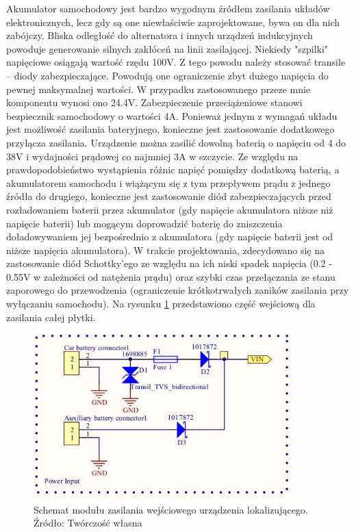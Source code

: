 Akumulator samochodowy jest bardzo wygodnym źródłem zasilania układów elektronicznych, lecz gdy są one niewłaściwie zaprojektowane, bywa on dla nich zabójczy. Bliska odległość do alternatora i innych urządzeń indukcyjnych powoduje generowanie silnych zakłóceń na linii zasilającej. Niekiedy "szpilki" napięciowe osiągają wartość rzędu 100V. Z tego powodu należy stosować transile – diody zabezpieczające. Powodują one ograniczenie zbyt dużego napięcia do pewnej maksymalnej wartości. W przypadku zastosowanego przeze mnie komponentu wynosi ono 24.4V. Zabezpieczenie przeciążeniowe stanowi bezpiecznik samochodowy o wartości 4A. 
Ponieważ jednym z wymagań układu jest możliwość zasilania bateryjnego, konieczne jest zastosowanie dodatkowego przyłącza zasilania. Urządzenie można zasilić dowolną baterią o napięciu od 4 do 38V i wydajności prądowej co najmniej 3A w szczycie. Ze względu na prawdopodobieństwo wystąpienia różnic napięć pomiędzy dodatkową baterią, a akumulatorem samochodu i wiążącym się z tym przepływem prądu z jednego źródła do drugiego, konieczne jest zastosowanie diód zabezpieczających przed rozładowaniem baterii przez akumulator (gdy napięcie akumulatora niższe niż napięcie baterii) lub mogącym doprowadzić baterię do zniszczenia doładowywaniem jej bezpośrednio z akumulatora (gdy napięcie baterii jest od niższe napięcia akumulatora). W trakcie projektowania, zdecydowano się na zastosowanie diód Schottky’ego ze względu na ich niski spadek napięcia (0.2 - 0.55V w zależności od natężenia prądu) oraz szybki czas przełączania ze stanu zaporowego do przewodzenia (ograniczenie krótkotrwałych zaników zasilania przy wyłączaniu samochodu). Na rysunku \ref{fig:image_mainboard_power_input} przedstawiono część wejściową dla zasilania całej płytki.

\begin{figure}[H]
	\centering
	\includegraphics[width=10cm]{img/schematics/mainboard_power_input.jpg}
	\caption{Schemat modułu zasilania wejściowego urządzenia lokalizującego. \\ Źródło: Twórczość własna}
	\label{fig:image_mainboard_power_input}
\end{figure}

